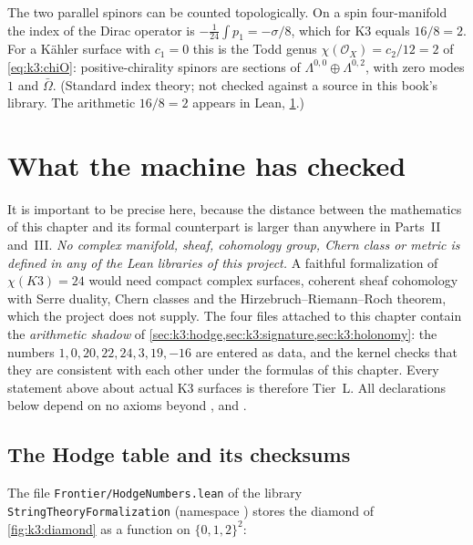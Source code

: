 \begin{remark}\label{rem:k3:dirac}
The two parallel spinors can be counted topologically. On a spin four-manifold the index of
the Dirac operator is $-\frac1{24}\int p_1=-\sigma/8$, which for K3 equals $16/8=2$. For a
Kähler surface with $c_1=0$ this is the Todd genus $\chi(\mathcal{O}_X)=c_2/12=2$ of
\eqref{eq:k3:chiO}: positive-chirality spinors are sections of
$\Lambda^{0,0}\oplus\Lambda^{0,2}$, with zero modes $1$ and $\bar\Omega$. (Standard index
theory; not checked against a source in this book's library. The arithmetic $16/8=2$ appears in
Lean, \cref{sec:k3:lean}.)
\end{remark}

\section{What the machine has checked}\label{sec:k3:lean}

It is important to be precise here, because the distance between the mathematics of this
chapter and its formal counterpart is larger than anywhere in Parts~II and~III. \emph{No
complex manifold, sheaf, cohomology group, Chern class or metric is defined in any of the Lean
libraries of this project.} A faithful formalization of $\chi(K3)=24$ would need compact complex
surfaces, coherent sheaf cohomology with Serre duality, Chern classes and the
Hirzebruch--Riemann--Roch theorem, which the project does not supply. The four files attached
to this chapter contain the \emph{arithmetic shadow} of
\cref{sec:k3:hodge,sec:k3:signature,sec:k3:holonomy}: the numbers $1,0,20,22,24,3,19,-16$ are
entered as data, and the kernel checks that they are consistent with each other under the
formulas of this chapter. Every statement above about actual K3 surfaces is therefore Tier~L.
All declarations below depend on no axioms beyond ,  and
.

\subsection{The Hodge table and its checksums}

The file \texttt{Frontier/HodgeNumbers.lean} of the library
\texttt{StringTheoryFormalization} (namespace ) stores the diamond of \cref{fig:k3:diamond} as a function on
$\{0,1,2\}^2$:

